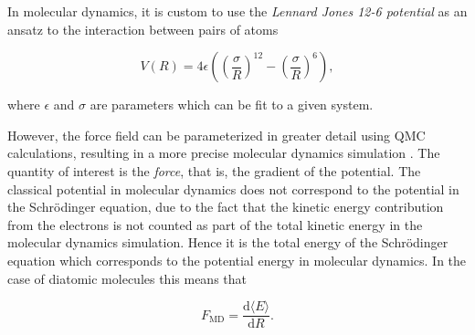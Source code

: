 \begin{figure}
\begin{center}
  \label{fig:molecules_R_vs_E}
  \setcounter{subfigure}{2}
  \label{fig:LennardJones}
 \end{center}
\end{figure}

In molecular dynamics, it is custom to use the \textit{Lennard Jones 12-6 potential} as an ansatz to the interaction between pairs of atoms \cite{MD1, MD2}

\begin{equation}
 V(R) = 4\epsilon \left(\left(\frac{\sigma}{R}\right)^{12} - \left(\frac{\sigma}{R}\right)^{6}\right),
\end{equation}

where $\epsilon$ and $\sigma$ are parameters which can be fit to a given system.

However, the force field can be parameterized in greater detail using QMC calculations, resulting in a more precise molecular dynamics simulation \cite{forcesQMC}. The quantity of interest is the \textit{force}, that is, the gradient of the potential. The classical potential in molecular dynamics does not correspond to the potential in the Schrödinger equation, due to the fact that the kinetic energy contribution from the electrons is not counted as part of the total kinetic energy in the molecular dynamics simulation. Hence it is the total energy of the Schrödinger equation which corresponds to the potential energy in molecular dynamics. In the case of diatomic molecules this means that 

\begin{equation}
 F_\mathrm{MD} = \frac{\mathrm{d}\langle E \rangle}{\mathrm{d}R}.
\end{equation}

